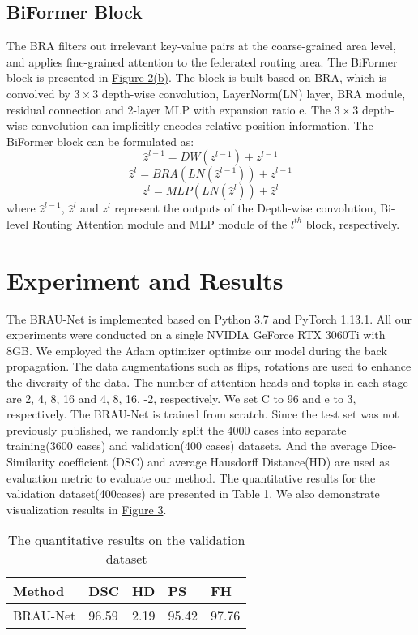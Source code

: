\documentclass[preprint,12pt]{elsarticle}
\begin{document}
\subsection{BiFormer Block}
The BRA filters out irrelevant key-value pairs at the coarse-grained area level, and applies fine-grained attention to the federated routing area. The BiFormer block is presented in \hyperlink{fig:second_image}{Figure 2(b)}. The block is built based on BRA, which is convolved by $3 \times 3$ depth-wise convolution, LayerNorm(LN) layer, BRA module, residual connection and 2-layer MLP with expansion ratio e. The $3 \times 3$ depth-wise convolution can implicitly encodes relative position information. The BiFormer block can be formulated as:
\[{\hat z^{l - 1}} = DW({z^{l - 1}}) + {z^{l - 1}}\]
\[{\hat z^l} = BRA(LN({\hat z^{l - 1}})) + {\hat z^{l - 1}}\]
\[{z^l} = MLP(LN({\hat z^l})) + {\hat z^l}\]
where ${\hat z^{l - 1}}$, ${\hat z^l}$ and ${z^l}$ represent the outputs of the Depth-wise convolution, Bi-level Routing Attention module and MLP module of the 
${l^{th}}$ block, respectively.


\section{Experiment and Results}
The BRAU-Net is implemented based on Python 3.7 and PyTorch 1.13.1. All our experiments were conducted on a single NVIDIA GeForce RTX 3060Ti with 8GB. We employed the Adam optimizer optimize our model during the back propagation. The data augmentations such as flips, rotations are used to enhance the diversity of the data. The number of attention heads and topks in each stage are 2, 4, 8, 16 and 4, 8, 16, -2, respectively. We set C to 96 and e to 3, respectively. The BRAU-Net is trained from scratch. Since the test set was not previously published, we randomly split the 4000 cases into separate training(3600 cases) and validation(400 cases) datasets. And the average Dice-Similarity coefficient (DSC) and average Hausdorff Distance(HD) are used as evaluation metric to evaluate our method. The quantitative results for the validation dataset(400cases) are presented in Table 1. We also demonstrate visualization results in \hyperlink{fig:third_image}{Figure 3}.

\begin{table}[htbp]
\centering
\caption{The quantitative results on the validation dataset}
\label{tab:your_table_label}
\begin{tabular}{lllll}
\toprule
Method   & DSC   & HD   & PS    & FH    \\
\midrule
BRAU-Net & 96.59 & 2.19 & 95.42 & 97.76 \\     
\bottomrule
\end{tabular}
\end{table}
\end{document}
